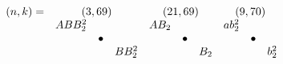 \documentclass{article}
\begin{document}
\(
\begin{array}{crclrclrclrclrclrclrclrcl}
  (n,k)= & \multicolumn{3}{c}{(3,69)} & \multicolumn{3}{c}{(21,69)} & \multicolumn{3}{c}{(9,70)} &  \\
  & ABB_2^2 & & & AB_2 & & & ab_2^2 & & &  \\
  & & \bullet & & & \bullet & & & \bullet & & &  \\
  & & & BB_2^2 & & & B_2 & & & b_2^2  
\end{array}
\)\\
\end{document}
